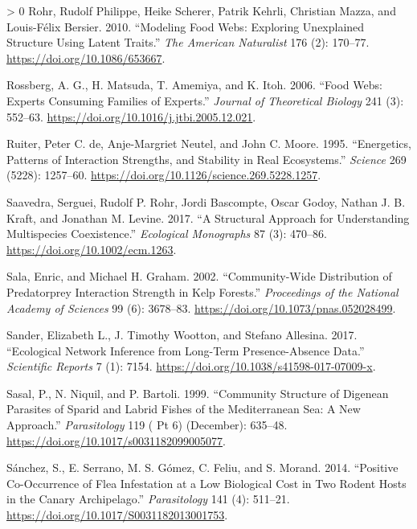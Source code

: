 \documentclass[10pt,oneside]{article}
\newlength{\cslhangindent}
\newenvironment{CSLReferences}[3] %
 {%
  \setlength{\parindent}{0pt}
  \ifodd #1 \everypar{\setlength{\hangindent}{\cslhangindent}}\ignorespaces\fi
  \ifnum #2 > 0
  \setlength{\parskip}{#2\baselineskip}
  \fi
 }%
 {}
\begin{document}
\begin{CSLReferences}{1}{0}
\leavevmode\hypertarget{ref-Rohr2010ModFoo}{}%
Rohr, Rudolf Philippe, Heike Scherer, Patrik Kehrli, Christian Mazza,
and Louis-Félix Bersier. 2010. {``Modeling Food Webs: Exploring
Unexplained Structure Using Latent Traits.''} \emph{The American
Naturalist} 176 (2): 170--77. \url{https://doi.org/10.1086/653667}.

\leavevmode\hypertarget{ref-Rossberg2006FooWeb}{}%
Rossberg, A. G., H. Matsuda, T. Amemiya, and K. Itoh. 2006. {``Food
Webs: Experts Consuming Families of Experts.''} \emph{Journal of
Theoretical Biology} 241 (3): 552--63.
\url{https://doi.org/10.1016/j.jtbi.2005.12.021}.

\leavevmode\hypertarget{ref-Ruiter1995EnePat}{}%
Ruiter, Peter C. de, Anje-Margriet Neutel, and John C. Moore. 1995.
{``Energetics, Patterns of Interaction Strengths, and Stability in Real
Ecosystems.''} \emph{Science} 269 (5228): 1257--60.
\url{https://doi.org/10.1126/science.269.5228.1257}.

\leavevmode\hypertarget{ref-Saavedra2017StrApp}{}%
Saavedra, Serguei, Rudolf P. Rohr, Jordi Bascompte, Oscar Godoy, Nathan
J. B. Kraft, and Jonathan M. Levine. 2017. {``A Structural Approach for
Understanding Multispecies Coexistence.''} \emph{Ecological Monographs}
87 (3): 470--86. \url{https://doi.org/10.1002/ecm.1263}.

\leavevmode\hypertarget{ref-Sala2002ComDis}{}%
Sala, Enric, and Michael H. Graham. 2002. {``Community-Wide Distribution
of Predatorprey Interaction Strength in Kelp Forests.''}
\emph{Proceedings of the National Academy of Sciences} 99 (6): 3678--83.
\url{https://doi.org/10.1073/pnas.052028499}.

\leavevmode\hypertarget{ref-Sander2017EcoNet}{}%
Sander, Elizabeth L., J. Timothy Wootton, and Stefano Allesina. 2017.
{``Ecological Network Inference from Long-Term Presence-Absence Data.''}
\emph{Scientific Reports} 7 (1): 7154.
\url{https://doi.org/10.1038/s41598-017-07009-x}.

\leavevmode\hypertarget{ref-Sasal1999ComStr}{}%
Sasal, P., N. Niquil, and P. Bartoli. 1999. {``Community Structure of
Digenean Parasites of Sparid and Labrid Fishes of the Mediterranean Sea:
A New Approach.''} \emph{Parasitology} 119 ( Pt 6) (December): 635--48.
\url{https://doi.org/10.1017/s0031182099005077}.

\leavevmode\hypertarget{ref-Sanchez2014PosCoo}{}%
Sánchez, S., E. Serrano, M. S. Gómez, C. Feliu, and S. Morand. 2014.
{``Positive Co-Occurrence of Flea Infestation at a Low Biological Cost
in Two Rodent Hosts in the Canary Archipelago.''} \emph{Parasitology}
141 (4): 511--21. \url{https://doi.org/10.1017/S0031182013001753}.


\end{CSLReferences}
\end{document}
